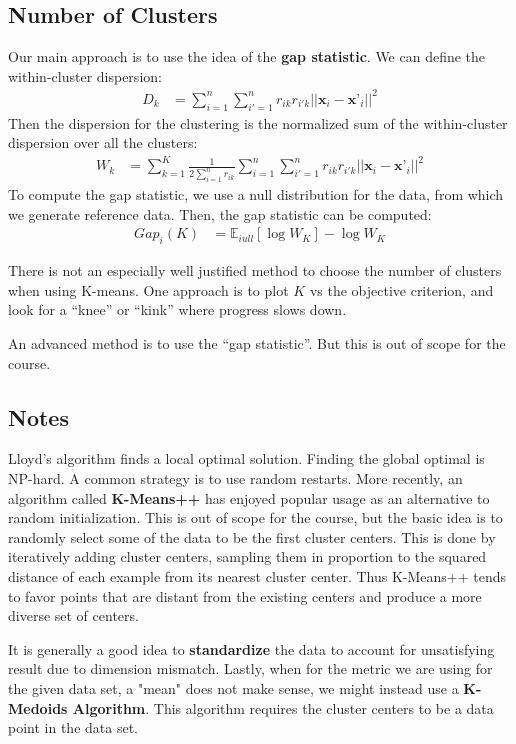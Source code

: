 \documentclass[12pt,letterpaper]{article}
\begin{document}
\subsection{Number of Clusters}

Our main approach is to use the idea of the \textbf{gap statistic}. We can define the within-cluster dispersion:
\begin{align*}
	 D_k &= \sum_{i=1}^{n} \sum_{i'=1}^{n} r_{ik} r_{i'k} ||\textbf{x}_i - \textbf{x'}_i||^2
\end{align*}
Then the dispersion for the clustering is the normalized sum of the within-cluster dispersion over all the clusters:
\begin{align*}
	 W_k &= \sum_{k=1}^{K} \frac{1}{2\sum_{i=1}^{n} r_{ik}} \sum_{i=1}^{n} \sum_{i'=1}^{n} r_{ik} r_{i'k} ||\textbf{x}_i - \textbf{x'}_i||^2
\end{align*}
To compute the gap statistic, we use a null distribution for the data, from which we generate reference data. Then, the gap statistic can be computed:
\begin{align*}
	 Gap_i(K) &= \mathbb{E}_{iull}[\log{W_K}] - \log{W_K} 
\end{align*}
\fi

There is not an especially well justified method to choose the number
of clusters when using K-means. One approach is to plot $K$ vs the
objective criterion, and look for a ``knee'' or ``kink'' where
progress slows down.

An advanced method is to use the ``gap statistic''. But this is out of
scope for the course.

\subsection{Notes}

Lloyd's algorithm finds a local optimal solution.  Finding the global
optimal is NP-hard. A common strategy is to use random restarts. More
recently, an algorithm called \textbf{K-Means++} has enjoyed popular
usage as an alternative to random initialization. This is out of scope
for the course, but the basic idea is to randomly select some of the
data to be the first cluster centers.  This is done by iteratively
adding cluster centers, sampling them in proportion to the squared
distance of each example from its nearest cluster center.  Thus
K-Means++ tends to favor points that are distant from the existing
centers and produce a more diverse set of centers.

It is generally a good idea to \textbf{standardize} the data to account for unsatisfying result due to dimension mismatch.
Lastly, when for the metric we are using for the given data set, a "mean" does not make sense, we might instead use a \textbf{K-Medoids Algorithm}. This algorithm requires the cluster centers to be a data point in the data set. 
\end{document}
